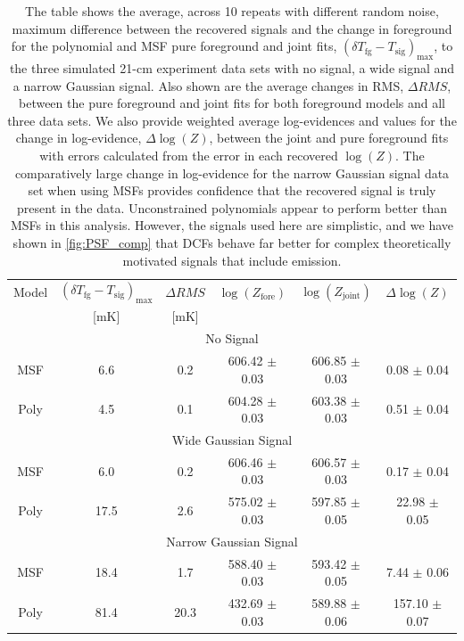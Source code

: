 \begin{table}
    \centering
    \begin{tabular}{cccccc}
        \hline
          Model& $(\delta T_\mathrm{fg} - T_\mathrm{sig})_\mathrm{max}$ & $\Delta RMS$ & $\log(Z_\mathrm{fore})$ & $\log(Z_\mathrm{joint})$ & $\Delta \log(Z)$\\
          & [mK] & [mK] \\
         \hline
         \multicolumn{6}{c}{No Signal}\\
         \hline
         MSF & 6.6 &  0.2 & 606.42 $\pm$ 0.03 & 606.85 $\pm$ 0.03 & 0.08 $\pm$ 0.04\\
         Poly & 4.5 &  0.1 & 604.28 $\pm$ 0.03 & 603.38 $\pm$ 0.03 & 0.51 $\pm$ 0.04\\
         \hline
         \multicolumn{6}{c}{Wide Gaussian Signal}\\
         \hline
         MSF & 6.0 &  0.2 & 606.46 $\pm$ 0.03 & 606.57 $\pm$ 0.03 & 0.17 $\pm$ 0.04\\
         Poly & 17.5 &  2.6 & 575.02 $\pm$ 0.03 & 597.85 $\pm$ 0.05 & 22.98 $\pm$ 0.05\\
         \hline
         \multicolumn{6}{c}{Narrow Gaussian Signal}\\
         \hline
         MSF & 18.4 & 1.7 & 588.40 $\pm$ 0.03 & 593.42 $\pm$ 0.05 & 7.44 $\pm$ 0.06\\
         Poly & 81.4 & 20.3 & 432.69 $\pm$ 0.03 & 589.88 $\pm$ 0.06 & 157.10 $\pm$ 0.07\\
    \end{tabular}
    \caption{The table shows the average, across 10 repeats with different random noise, maximum difference between the recovered signals and the change in foreground for the polynomial and MSF pure foreground and joint fits, $(\delta T_\mathrm{fg} - T_\mathrm{sig})_\mathrm{max}$, to the three simulated 21-cm experiment data sets with no signal, a wide signal and a narrow Gaussian signal. Also shown are the average changes in RMS, $\Delta RMS$, between the pure foreground and joint fits for both foreground models and all three data sets. We also provide weighted average log-evidences and values for the change in log-evidence, $\Delta \log(Z)$, between the joint and pure foreground fits with errors calculated from the error in each recovered $\log(Z)$. The comparatively large change in log-evidence for the narrow Gaussian signal data set when using MSFs provides confidence that the recovered signal is truly present in the data. Unconstrained polynomials appear to perform better than MSFs in this analysis. However, the signals used here are simplistic, and we have shown in \cref{fig:PSF_comp} that DCFs behave far better for complex theoretically motivated signals that include emission.}
    \label{tab:gauss_summary}
\end{table}

